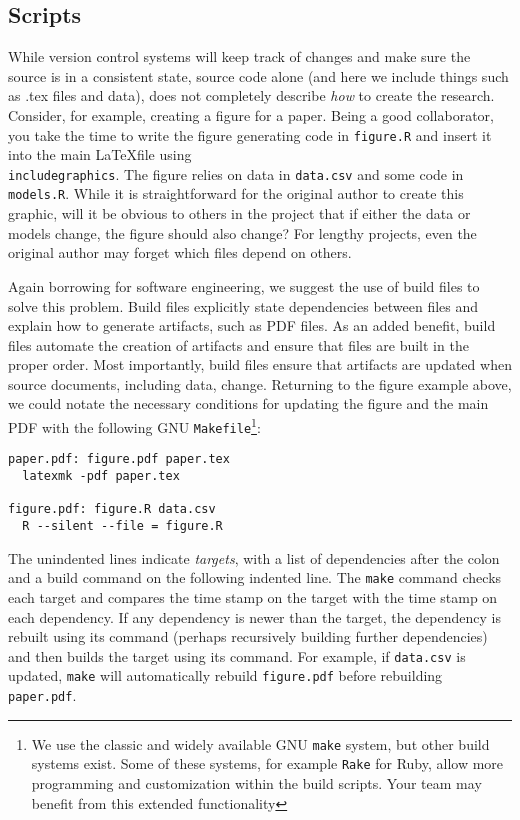 \documentclass[]{article}
\begin{document}
\subsection{Scripts}
While version control systems will keep track of changes and make sure the
source is in a consistent state,  %
source code alone (and here we include things such as .tex files and data),
does not completely describe \emph{how} to create the research. Consider, for
example, creating a figure for a paper. Being a good collaborator, you take
the time to write the figure generating code in \texttt{figure.R} and insert
it into the main \LaTeX file using
\texttt{\\includegraphics}. The figure relies on data in \texttt{data.csv} and
some code in \texttt{models.R}. While it is straightforward for the original
author to create this graphic, will it be obvious to others in the project
that if either the data or models change, the figure should also change? For
lengthy projects, even the original author may forget which files depend on
others.

Again borrowing for software engineering, we suggest the use of build files to
solve this problem. Build files explicitly state dependencies between files
and explain how to generate artifacts, such as PDF files. As an added benefit,
build files automate the creation of artifacts and ensure that files are built
in the proper order. Most importantly, build files ensure that artifacts are
updated when source documents, including data, change. Returning to the figure
example above, we could notate the necessary conditions for updating the
figure and the main PDF with the following GNU \texttt{Makefile}\footnote{We
use the classic and widely available GNU \texttt{make} system, but other build
systems exist. Some of these systems, for example \texttt{Rake} for Ruby,
allow more programming and customization within the build scripts. Your team
may benefit from this extended functionality}:

\begin{verbatim}
paper.pdf: figure.pdf paper.tex
  latexmk -pdf paper.tex

figure.pdf: figure.R data.csv
  R --silent --file = figure.R
\end{verbatim}

The unindented lines indicate \emph{targets}, with a list of dependencies
after the colon and a build command on the following indented line.
The \texttt{make} command checks each target and compares the
time stamp on the target with the time stamp on each dependency. If any
dependency is newer than the target, the dependency is rebuilt using its
command (perhaps recursively building further dependencies) and then builds
the target using its command. For example, if \texttt{data.csv} is updated,
\texttt{make} will automatically rebuild \texttt{figure.pdf} before rebuilding
\texttt{paper.pdf}.
\end{document}
